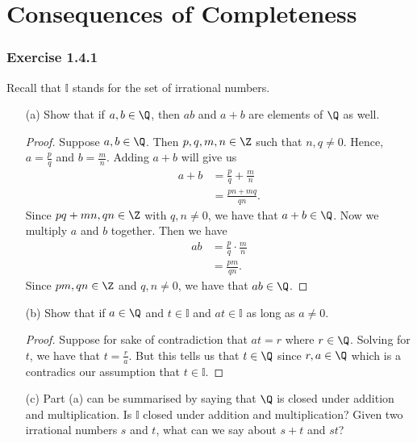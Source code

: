 \section{Consequences of Completeness}

\subsubsection{Exercise 1.4.1} Recall that \( \mathbb{I}\) stands for the set of irrational numbers. 

\begin{enumerate}
    \item[(a)] Show that if \( a,b \in \Q \), then \( ab \) and \( a + b \) are elements of \( \Q \) as well. 
        
    
    \begin{proof}
        Suppose \( a,b \in \Q \). Then \( p,q,m,n \in \Z \) such that \( n, q \neq 0 \). Hence, \( a = \frac{p}{q} \) and \( b = \frac{m}{n}\). Adding \( a + b \) will give us 
        \begin{align*}
            a + b &= \frac{p}{q} + \frac{m}{n} \\ 
                  &= \frac{pn + mq}{qn}. 
        \end{align*}
        Since \( pq + mn, qn \in \Z \) with \( q,n \neq 0 \), we have that \( a + b \in \Q \). Now we multiply \( a \) and \( b \) together. Then we have 
        \begin{align*}
            ab &= \frac{p}{q} \cdot \frac{m}{n} \\ 
               &= \frac{pm}{qn}.
        \end{align*}
        Since \( pm, qn \in \Z \) and \( q,n \neq 0 \), we have that \( ab \in \Q \).
    \end{proof}

    \item[(b)] Show that if \( a \in \Q  \) and \( t \in \mathbb{I} \) and \( at \in \mathbb{I} \) as long as \( a \neq 0 \). 
    \begin{proof}
       Suppose for sake of contradiction that \( at = r \) where \( r \in \Q \). Solving for \( t \), we have that \( t = \frac{r}{a} \). But this tells us that \( t \in \Q \) since \( r, a \in \Q \) which is a contradics our assumption that \( t \in \mathbb{I} \).
    
    \end{proof}
     
    \item[(c)] Part (a) can be summarised by saying that \( \Q \) is closed under addition and multiplication. Is \( \mathbb{I} \) closed under addition and multiplication? Given two irrational numbers \( s \) and \( t \), what can we say about \( s + t \) and \( st\)?
        

\end{enumerate}
